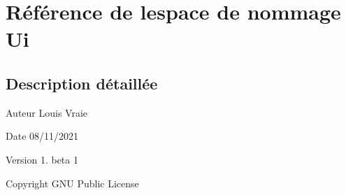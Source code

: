 \hypertarget{namespace_ui}{}\section{Référence de l\textquotesingle{}espace de nommage Ui}
\label{namespace_ui}


\subsection{Description détaillée}
\begin{DoxyAuthor}{Auteur}
Louis Vraie 
\end{DoxyAuthor}
\begin{DoxyDate}{Date}
08/11/2021 
\end{DoxyDate}
\begin{DoxyVersion}{Version}
1. beta 1 
\end{DoxyVersion}
\begin{DoxyCopyright}{Copyright}
G\+NU Public License 
\end{DoxyCopyright}

